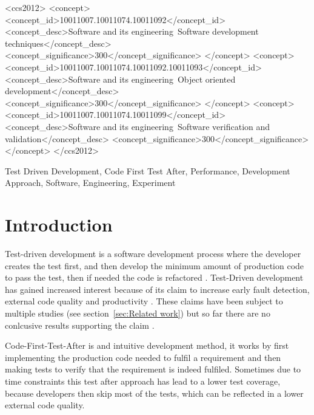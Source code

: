 \documentclass{sig-alternate-05-2015}
\begin{document}
%
%
\begin{CCSXML}
<ccs2012>
<concept>
<concept_id>10011007.10011074.10011092</concept_id>
<concept_desc>Software and its engineering~Software development techniques</concept_desc>
<concept_significance>300</concept_significance>
</concept>
<concept>
<concept_id>10011007.10011074.10011092.10011093</concept_id>
<concept_desc>Software and its engineering~Object oriented development</concept_desc>
<concept_significance>300</concept_significance>
</concept>
<concept>
<concept_id>10011007.10011074.10011099</concept_id>
<concept_desc>Software and its engineering~Software verification and validation</concept_desc>
<concept_significance>300</concept_significance>
</concept>
</ccs2012>
\end{CCSXML}



%
%

%
%
\printccsdesc

\begin{keywords}
Test Driven Development, Code First Test After, Performance, Development Approach, Software, Engineering, \newline Experiment
\end{keywords}

\section{Introduction}
Test-driven development is a software development process where the developer creates the test first, and then develop the minimum amount of production code to pass the test, then if needed the code is refactored \cite{beck1}. Test-Driven development has gained increased interest because of its claim to increase early fault detection,  external code quality and productivity \cite{astels1}. These claims have been subject to multiple studies (see section~\ref{sec:Related work}) but so far there are no conlcusive results supporting the claim \cite{shull1}.

Code-First-Test-After is and intuitive development method, it works by first implementing the production code needed to fulfil a requirement and then making tests to verify that the requirement is indeed fulfiled. Sometimes due to time constraints this test after approach has lead to a lower test coverage, because developers then skip most of the tests, which can be reflected in a lower external code quality.
\end{document}
